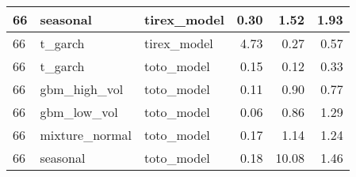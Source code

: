 {\begin{tabular}{lllrrr}
\midrule
66 & seasonal & tirex\_model & 0.30 & 1.52 & 1.93 \\
\midrule
66 & t\_garch & tirex\_model & 4.73 & 0.27 & 0.57 \\
\midrule
66 & t\_garch & toto\_model & 0.15 & 0.12 & 0.33 \\
\midrule
66 & gbm\_high\_vol & toto\_model & 0.11 & 0.90 & 0.77 \\
\midrule
66 & gbm\_low\_vol & toto\_model & 0.06 & 0.86 & 1.29 \\
\midrule
66 & mixture\_normal & toto\_model & 0.17 & 1.14 & 1.24 \\
\midrule
66 & seasonal & toto\_model & 0.18 & 10.08 & 1.46 \\
\bottomrule
\end{tabular}
}
